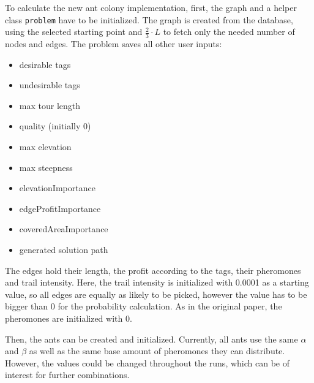To calculate the new ant colony implementation, first, the graph and a helper class \texttt{problem} have to be initialized. 
The graph is created from the database, using the selected starting point and $\frac{2}{3} \cdot L$ to fetch only the needed number of nodes and edges.
The problem saves all other user inputs:


\begin{minipage}[t][2cm][b]{0.3\textwidth}
	\begin{itemize}
		\item desirable tags
		\item undesirable tags
		\item max tour length
	
	\end{itemize}
\end{minipage}
\begin{minipage}[t][2cm][b]{0.3\textwidth}
	\begin{itemize}
		\item quality (initially 0)
		\item max elevation
		\item max steepness
	\end{itemize}	
\end{minipage}
\begin{minipage}[t][2.9cm][b]{0.33\textwidth}
	\begin{itemize}
		\item elevationImportance
		\item edgeProfitImportance
		\item coveredAreaImportance
		\item generated solution path
	\end{itemize}	
\end{minipage}

\vspace{1cm}
The edges hold their length, the profit according to the tags, their pheromones and trail intensity. 
Here, the trail intensity is initialized with 0.0001 as a starting value, so all edges are equally as likely to be picked, however the value has to be bigger than 0 for the probability calculation.
As in the original paper, the pheromones are initialized with 0.

Then, the ants can be created and initialized. 
Currently, all ants use the same $\alpha$ and $\beta$ as well as the same base amount of pheromones they can distribute.
However, the values could be changed throughout the runs, which can be of interest for further combinations.

